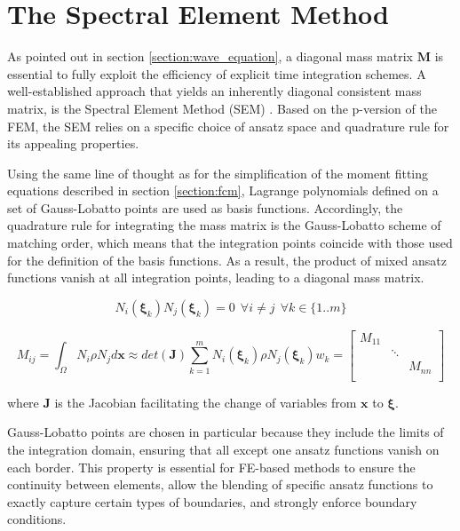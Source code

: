 %
\section{The Spectral Element Method}
\label{section:sem}
%

As pointed out in section \ref{section:wave_equation}, a diagonal mass matrix $\mathbf M$ is essential to fully exploit the efficiency of explicit time integration schemes. A well-established approach that yields an inherently diagonal consistent mass matrix, is the Spectral Element Method (SEM) \cite{Maggio1994}. Based on the p-version of the FEM, the SEM relies on a specific choice of ansatz space and quadrature rule for its appealing properties.

Using the same line of thought as for the simplification of the moment fitting equations described in section \ref{section:fcm}, Lagrange polynomials defined on a set of Gauss-Lobatto points are used as basis functions. Accordingly, the quadrature rule for integrating the mass matrix is the Gauss-Lobatto scheme of matching order, which means that the integration points coincide with those used for the definition of the basis functions. As a result, the product of mixed ansatz functions vanish at all integration points, leading to a diagonal mass matrix.

\begin{equation}
	N_i(\boldsymbol{\xi}_k)N_j(\boldsymbol{\xi}_k) = 0 \ \ \forall i \neq j \ \ \forall k \in \{1..m\}
\end{equation}

\begin{equation}
	M_{ij} = \int_{\Omega} N_i \rho N_j d\mathbf x
	\approx
	det(\mathbf J) \sum_{k=1}^m N_i(\boldsymbol{\xi}_k) \rho N_j(\boldsymbol{\xi}_k) w_k
	=
	\begin{bmatrix}
		M_{11} & & \\
		& \ddots & \\
		& & M_{nn} \\
	\end{bmatrix}
\end{equation}

where $\mathbf J$ is the Jacobian facilitating the change of variables from $\mathbf x$ to $\boldsymbol{\xi}$.

Gauss-Lobatto points are chosen in particular because they include the limits of the integration domain, ensuring that all except one ansatz functions vanish on each border. This property is essential for FE-based methods to ensure the continuity between elements, allow the blending of specific ansatz functions to exactly capture certain types of boundaries, and strongly enforce boundary conditions.

